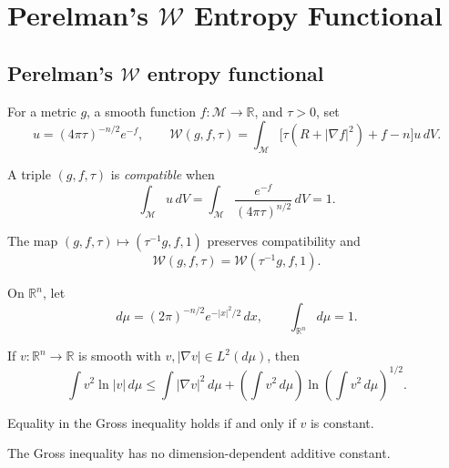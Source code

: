 \chapter{Perelman's \texorpdfstring{$\mathcal W$}{W} Entropy Functional}

\section{Perelman's \texorpdfstring{$\mathcal W$}{W} entropy functional}

For a metric $g$, a smooth function $f:\mathcal M\to\mathbb R$, and
$\tau>0$, set
\[
u=(4\pi\tau)^{-n/2}e^{-f},\qquad
\mathcal W(g,f,\tau)=\int_{\mathcal M}
\bigl[\tau(R+|\nabla f|^2)+f-n\bigr]u\,dV.
\]

\begin{definition}
\label{topping-ch8-compatible-arguments}
A triple $(g,f,\tau)$ is \emph{compatible} when
\[
\int_{\mathcal M}u\,dV
=\int_{\mathcal M}\frac{e^{-f}}{(4\pi\tau)^{n/2}}\,dV=1.
\]
\end{definition}

\begin{proposition}
\label{topping-ch8-scale-invariance}
The map $(g,f,\tau)\mapsto(\tau^{-1}g,f,1)$ preserves compatibility and
\[
\mathcal W(g,f,\tau)=\mathcal W(\tau^{-1}g,f,1).
\]
\end{proposition}

On $\mathbb R^n$, let
\[
d\mu=(2\pi)^{-n/2}e^{-|x|^2/2}\,dx,
\qquad \int_{\mathbb R^n}d\mu=1.
\]

\begin{theorem}
\label{topping-ch8-gross-log-sobolev}
If $v:\mathbb R^n\to\mathbb R$ is smooth with
$v,|\nabla v|\in L^2(d\mu)$, then
\[
\int v^2\ln|v|\,d\mu
\leq \int|\nabla v|^2\,d\mu
+\left(\int v^2\,d\mu\right)
 \ln\left(\int v^2\,d\mu\right)^{1/2}.
\]
\end{theorem}

\begin{remark}
\label{topping-ch8-gross-equality}
Equality in the Gross inequality holds if and only if $v$ is constant.
\end{remark}

\begin{remark}
\label{topping-ch8-gross-no-dimension-constant}
The Gross inequality has no dimension-dependent additive constant.
\end{remark}

